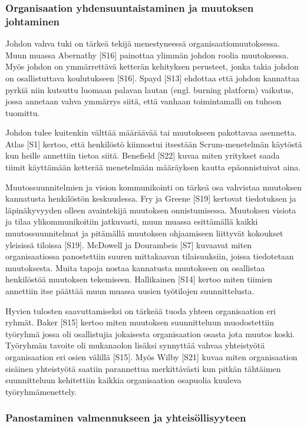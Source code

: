 \subsubsection{Organisaation yhdensuuntaistaminen ja muutoksen johtaminen}

Johdon vahva tuki on tärkeä tekijä menestyneessä organisaatiomuutoksessa.
Muun muassa Abernathy [S16] painottaa ylimmän johdon roolia muutoksessa. Myös
johdon on ymmärrettävä ketterän kehityksen perusteet, jonka takia johdon on
osallistuttava koulutukseen [S16]. Spayd [S13] ehdottaa että johdon kannattaa
pyrkiä niin kutsuttu luomaan palavan lautan (engl. burning platform) vaikutus,
jossa annetaan vahva ymmärrys siitä, että vanhaan toimintamalli on tuhoon
tuomittu.

Johdon tulee kuitenkin välttää määräävää tai muutokseen pakottavaa asennetta.
Atlas [S1] kertoo, että henkilöstö kiinnostui itsestään Scrum-menetelmän
käytöstä kun heille annettiin tietoa siitä. Benefield [S22] kuvaa miten
yritykset saada tiimit käyttämään ketterää menetelmään määräyksen kautta
epäonnistuivat aina.

Muutossuunnitelmien ja vision kommunikointi on tärkeä osa vahvistaa muutoksen
kannatusta henkilöstön keskuudessa. Fry ja Greene [S19] kertovat tiedotuksen ja
läpinäkyvyyden olleen avaintekijä muutoksen onnistumisessa. Muutoksen visiota ja
tilaa ylikommunikoitiin jatkuvasti, muun muassa esittämällä kaikki
muutossuunnitelmat ja pitämällä muutoksen ohjaamiseen liittyvät kokoukset
yleisissä tiloissa [S19]. McDowell ja Dourambeis [S7] kuvaavat miten
organisaatiossa panostettiin suuren mittakaavan tilaisuuksiin, joissa
tiedotetaan muutoksesta. Muita tapoja nostaa kannatusta muutokseen on osallistaa
henkilöstöä muutoksen tekemiseen. Hallikainen [S14] kertoo miten tiimien
annettiin itse päättää muun muassa uusien työtilojen suunnittelusta.

Hyvien tulosten saavuttamiseksi on tärkeää tuoda yhteen organisaation eri
ryhmät. Baker [S15] kertoo miten muutoksen suunnitteluun muodostettiin työryhmä
jossa oli osallistujia jokaisesta organisaation osasta jota muutos koski.
Työryhmän tavoite oli mukanaolon lisäksi synnyttää vahvaa yhteistyötä
organisaation eri osien välillä [S15]. Myös Wilby [S21] kuvaa miten
organisaation sisäinen yhteistyötä saatiin parannettua merkittävästi kun pitkän
tähtäimen suunnitteluun kehitettiin kaikkia organisaation osapuolia kuuleva
työryhmämenettely.

\subsubsection{Panostaminen valmennukseen ja yhteisöllisyyteen}

